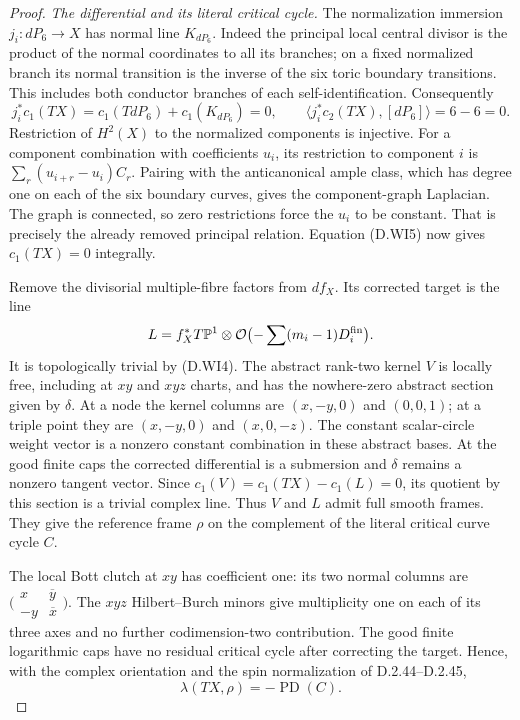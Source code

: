 \begin{proof}
\emph{The differential and its literal critical cycle.}
The normalization immersion $j_i:dP_6\longrightarrow X$ has
normal line $K_{dP_6}$.  Indeed the principal local central
divisor is the product of the normal coordinates to all its
branches; on a fixed normalized branch its normal transition
is the inverse of the six toric boundary transitions.  This
includes both conductor branches of each self-identification.
Consequently
\[
 j_i^*c_1(TX)=c_1(TdP_6)+c_1(K_{dP_6})=0,\qquad
 \langle j_i^*c_2(TX),[dP_6]\rangle=6-6=0 .
 \tag{D.WI5}
\]
Restriction of $H^2(X)$ to the normalized components is injective.
For a component combination with coefficients $u_i$, its
restriction to component $i$ is
$\sum_r(u_{i+r}-u_i)C_r$.  Pairing with the anticanonical ample
class, which has degree one on each of the six boundary curves,
gives the component-graph Laplacian.  The graph is connected, so
zero restrictions force the $u_i$ to be constant.  That is
precisely the already removed principal relation.  Equation
(D.WI5) now gives $c_1(TX)=0$ integrally.

Remove the divisorial multiple-fibre factors from $df_X$.  Its
corrected target is the line
\[
 L=f_X^*T\mathbb P^1\otimes
                      \mathcal O\bigl(-\sum (m_i-1)D_i^{\rm fin}\bigr).
\]
It is topologically trivial by (D.WI4).  The abstract rank-two
kernel $V$ is locally free, including at $xy$ and $xyz$ charts,
and has the nowhere-zero abstract section given by $\delta$.
At a node the kernel columns are $(x,-y,0)$ and $(0,0,1)$;
at a triple point they are $(x,-y,0)$ and $(x,0,-z)$.
The constant scalar-circle weight vector is a nonzero constant
combination in these abstract bases.  At the good finite caps
the corrected differential is a submersion and $\delta$ remains
a nonzero tangent vector.  Since
$c_1(V)=c_1(TX)-c_1(L)=0$, its quotient by this section is a
trivial complex line.  Thus $V$ and $L$ admit full smooth frames.
They give the reference frame $\rho$ on the complement of the
literal critical curve cycle $C$.

The local Bott clutch at $xy$ has coefficient one:
its two normal columns are
$\bigl(\begin{smallmatrix}x&\overline y\\-y&\overline x\end{smallmatrix}\bigr)$.
The $xyz$ Hilbert--Burch minors give multiplicity one on each
of its three axes and no further codimension-two contribution.
The good finite logarithmic caps have no residual critical
cycle after correcting the target.  Hence, with the complex
orientation and the spin normalization of D.2.44--D.2.45,
\[
                 \lambda(TX,\rho)=-\operatorname{PD}(C).
 \tag{D.WI6}
\]


\end{proof}
